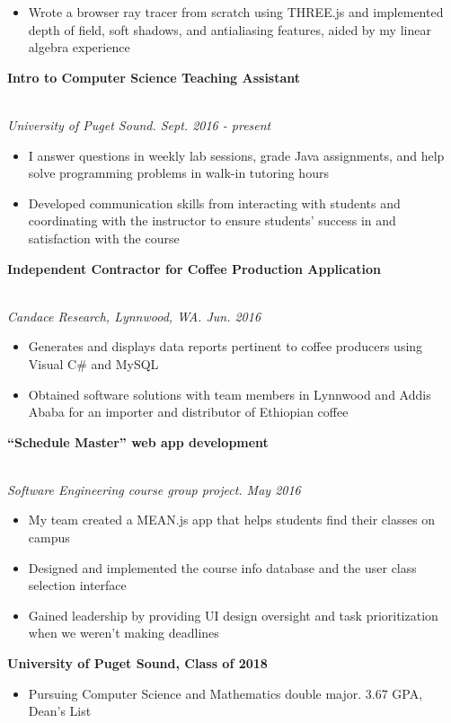 \documentclass[11pt]{article}
\newcommand\phv{\fontfamily{phv}\selectfont}
\begin{document}
\begin{itemize}
	\item Wrote a browser ray tracer from scratch using THREE.js and implemented depth of field, soft shadows, and antialiasing features, aided by my linear algebra experience
\end{itemize}
\noindent \centerline{\large \bf Intro to Computer Science Teaching Assistant \hfill }
\\\emph{University of Puget Sound. Sept. 2016 - present}
\begin{itemize}
  \item I answer questions in weekly lab sessions, grade Java assignments, and help solve programming problems in walk-in tutoring hours
  \item Developed communication skills from interacting with students and coordinating with the instructor to ensure students' success in and satisfaction with the course
\end{itemize}
\noindent \centerline{\large \bf Independent Contractor for Coffee Production Application \hfill }
\\\emph{Candace Research, Lynnwood, WA. Jun. 2016}
\begin{itemize}
  \item Generates and displays data reports pertinent to coffee producers using Visual C\# and MySQL
  \item Obtained software solutions with team members in Lynnwood and Addis Ababa for an importer and distributor of Ethiopian coffee
\end{itemize}
\noindent \centerline{\large \bf ``Schedule Master'' web app development \hfill }
\\\emph{Software Engineering course group project. May 2016}
\begin{itemize}
  \item My team created a MEAN.js app that helps students find their classes on campus
  \item Designed and implemented the course info database and the user class selection interface
  \item Gained leadership by providing UI design oversight and task prioritization when we weren't making deadlines
\end{itemize}
\noindent{\LARGE \bf \phv{Education}  } \medskip \newline
\noindent \centerline{\large \bf University of Puget Sound, Class of 2018 \hfill }
\begin{itemize}
  \item Pursuing Computer Science and Mathematics double major. 3.67 GPA, Dean's List

\end{itemize}
\end{document}
